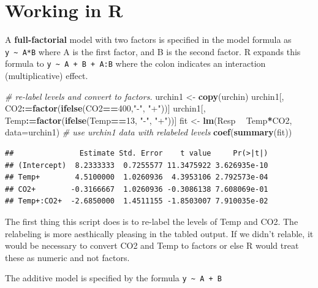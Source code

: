 \documentclass[]{book}
\newenvironment{Shaded}{\begin{snugshade}}{\end{snugshade}}
\newcommand{\KeywordTok}[1]{\textcolor[rgb]{0.13,0.29,0.53}{\textbf{#1}}}
\newcommand{\DataTypeTok}[1]{\textcolor[rgb]{0.13,0.29,0.53}{#1}}
\newcommand{\DecValTok}[1]{\textcolor[rgb]{0.00,0.00,0.81}{#1}}
\newcommand{\StringTok}[1]{\textcolor[rgb]{0.31,0.60,0.02}{#1}}
\newcommand{\CommentTok}[1]{\textcolor[rgb]{0.56,0.35,0.01}{\textit{#1}}}
\newcommand{\OperatorTok}[1]{\textcolor[rgb]{0.81,0.36,0.00}{\textbf{#1}}}
\newcommand{\ErrorTok}[1]{\textcolor[rgb]{0.64,0.00,0.00}{\textbf{#1}}}
\newcommand{\NormalTok}[1]{#1}
\theoremstyle{definition}
\theoremstyle{definition}
\theoremstyle{definition}
\theoremstyle{remark}
\begin{document}
\section{Working in R}\label{working-in-r-2}

A \textbf{full-factorial} model with two factors is specified in the
model formula as \texttt{y\ \textasciitilde{}\ A*B} where A is the first
factor, and B is the second factor. R expands this formula to
\texttt{y\ \textasciitilde{}\ A\ +\ B\ +\ A:B} where the colon indicates
an interaction (multiplicative) effect.

\begin{Shaded}
\begin{Highlighting}[]
\CommentTok{# re-label levels and convert to factors.}
\NormalTok{urchin1 <-}\StringTok{ }\KeywordTok{copy}\NormalTok{(urchin)}
\NormalTok{urchin1[, CO2}\OperatorTok{:}\ErrorTok{=}\KeywordTok{factor}\NormalTok{(}\KeywordTok{ifelse}\NormalTok{(CO2}\OperatorTok{==}\DecValTok{400}\NormalTok{,}\StringTok{"-"}\NormalTok{, }\StringTok{"+"}\NormalTok{))]}
\NormalTok{urchin1[, Temp}\OperatorTok{:}\ErrorTok{=}\KeywordTok{factor}\NormalTok{(}\KeywordTok{ifelse}\NormalTok{(Temp}\OperatorTok{==}\DecValTok{13}\NormalTok{, }\StringTok{"-"}\NormalTok{, }\StringTok{"+"}\NormalTok{))]}
\NormalTok{fit <-}\StringTok{ }\KeywordTok{lm}\NormalTok{(Resp }\OperatorTok{~}\StringTok{ }\NormalTok{Temp}\OperatorTok{*}\NormalTok{CO2, }\DataTypeTok{data=}\NormalTok{urchin1) }\CommentTok{# use urchin1 data with relabeled levels}
\KeywordTok{coef}\NormalTok{(}\KeywordTok{summary}\NormalTok{(fit))}
\end{Highlighting}
\end{Shaded}

\begin{verbatim}
##               Estimate Std. Error    t value     Pr(>|t|)
## (Intercept)  8.2333333  0.7255577 11.3475922 3.626935e-10
## Temp+        4.5100000  1.0260936  4.3953106 2.792573e-04
## CO2+        -0.3166667  1.0260936 -0.3086138 7.608069e-01
## Temp+:CO2+  -2.6850000  1.4511155 -1.8503007 7.910035e-02
\end{verbatim}

The first thing this script does is to re-label the levels of Temp and
CO2. The relabeling is more aesthically pleasing in the tabled output.
If we didn't relable, it would be necessary to convert CO2 and Temp to
factors or else R would treat these as numeric and not factors.

The additive model is specified by the formula
\texttt{y\ \textasciitilde{}\ A\ +\ B}
\end{document}
